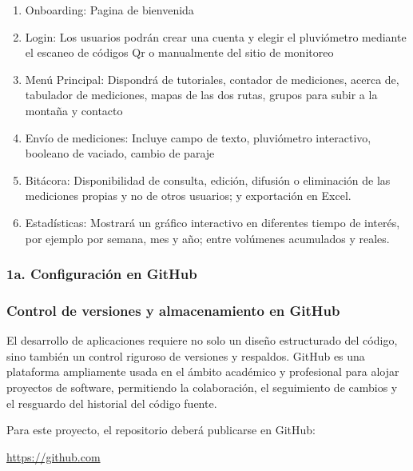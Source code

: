 \begin{enumerate}
\begin{enumerate}
     \begin{enumerate}
    \item Onboarding: Pagina de bienvenida 
    \item Login: Los usuarios podrán crear una cuenta y elegir el pluviómetro mediante el escaneo de códigos Qr o manualmente del sitio de monitoreo 
    \item Menú Principal: Dispondrá de tutoriales, contador de mediciones, acerca de, tabulador de mediciones, mapas de las dos rutas, grupos para subir a la montaña y contacto
    \item Envío de mediciones: Incluye campo de texto, pluviómetro interactivo, booleano de vaciado, cambio de paraje
    \item Bitácora: Disponibilidad de consulta, edición, difusión o eliminación de las mediciones propias y no de otros usuarios; y exportación en Excel.
    \item Estadísticas: Mostrará un gráfico interactivo en diferentes tiempo de interés, por ejemplo por semana, mes y año; entre volúmenes acumulados y reales.
\end{enumerate}
  \end{enumerate}
\end{enumerate}











\newpage
\subsubsection{1a. Configuración en GitHub}

\subsubsection*{Control de versiones y almacenamiento en GitHub}

El desarrollo de aplicaciones requiere no solo un diseño estructurado del código, sino también un control riguroso de versiones y respaldos. GitHub es una plataforma ampliamente usada en el ámbito académico y profesional para alojar proyectos de software, permitiendo la colaboración, el seguimiento de cambios y el resguardo del historial del código fuente. 

Para este proyecto, el repositorio deberá publicarse en GitHub:
\begin{center}
\url{https://github.com}
\end{center}

